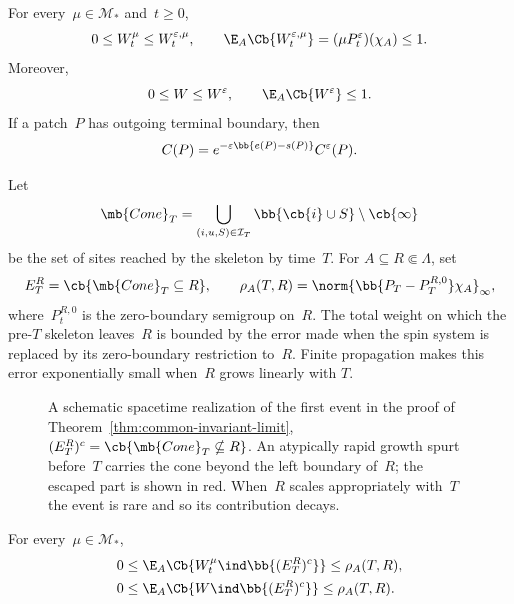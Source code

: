 \begin{lemma}
\label{lem:positive-weights}
For every~$\mu\in\mathcal M_*$ and~$t\geq0$,
\begin{equation}
\label{eq:positive-weight-comparison}
0\leq W_t^\mu\leq W_t^{\varepsilon,\mu},
\qquad
\E_A\Cb{W_t^{\varepsilon,\mu}}
=
(\mu P_t^\varepsilon)(\chi_A)
\leq1.
\end{equation}
Moreover,
\begin{equation}
\label{eq:limiting-weight-mass}
0\leq W\leq W^\varepsilon,
\qquad
\E_A\Cb{W^\varepsilon}\leq1.
\end{equation}
If a patch~$P$ has outgoing terminal boundary, then
\begin{equation}
\label{eq:outgoing-terminal-exact-factor}
C(P)
=
e^{-\varepsilon\bb{e(P)-s(P)}}C^\varepsilon(P).
\end{equation}
\end{lemma}

Let
\begin{equation*}
\mb{Cone}_T
=
\bigcup_{(i,u,S)\in\mathcal I_T}
\bb{\cb{i}\cup S}\setminus\cb{\infty}
\end{equation*}
be the set of sites reached by the skeleton by time~$T$. For
$A\subseteq R\Subset\Lambda$, set
\begin{equation*}
E_T^R=\cb{\mb{Cone}_T\subseteq R},
\qquad
\rho_A(T,R)
=
\norm{\bb{P_T-P_T^{R,0}}\chi_A}_\infty,
\end{equation*}
where~$P_t^{R,0}$ is the zero-boundary semigroup on~$R$. The total weight on
which the pre-$T$ skeleton leaves~$R$ is bounded by the error made when the
spin system is replaced by its zero-boundary restriction to~$R$. Finite
propagation makes this error exponentially small when~$R$ grows linearly with
$T$.

\begin{figure}[htbp]
\centering

\caption{A schematic spacetime realization of the first event in the proof of
Theorem~\ref{thm:common-invariant-limit},
$(E_T^R)^c=\cb{\mb{Cone}_T\nsubseteq R}$. An atypically rapid growth spurt
before~$T$ carries the cone beyond the left boundary of~$R$; the escaped part
is shown in red. When~$R$ scales appropriately with~$T$ the event is rare and so its contribution decays.}
\label{fig:convergence-spatial-escape}
\end{figure}

\begin{lemma}
\label{lem:spatial-confinement}
For every~$\mu\in\mathcal M_*$,
\begin{align}
0
&\leq
\E_A\Cb{W_t^\mu\ind\bb{(E_T^R)^c}}
\leq
\rho_A(T,R),
\label{eq:finite-horizon-confinement-bound}
\\
0
&\leq
\E_A\Cb{W\ind\bb{(E_T^R)^c}}
\leq
\rho_A(T,R).
\label{eq:limiting-confinement-bound}
\end{align}
\end{lemma}

